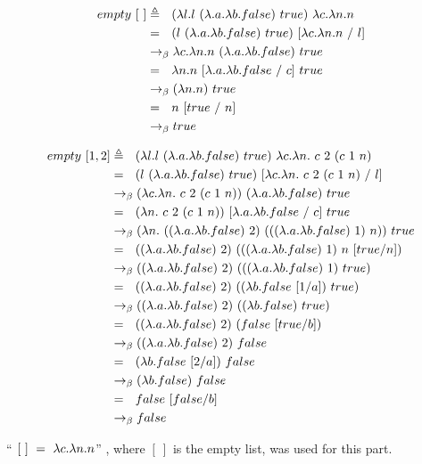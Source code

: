 \documentclass{article}
\begin{document}
\begin{Large}
		\begin{align*}
			empty \ [ \ ] &\triangleq \, \, \, \, (\lambda l.l \ (\lambda .a.\lambda b.false) \ true) \ \lambda c.\lambda n.n \\
			&= \, \, \, \, (l \ (\lambda .a.\lambda b.false) \ true) \ [\lambda c.\lambda n.n \ / \ l] \\
			&\rightarrow_\beta \lambda c.\lambda n.n \ (\lambda .a.\lambda b.false) \ true \\
			&= \, \, \, \, \lambda n.n \ [\lambda .a.\lambda b.false \ / \ c] \ true \\
			&\rightarrow_\beta (\lambda n.n) \ true \\
			&= \, \, \, \, n \ [true \ / \ n] \\
			&\rightarrow_\beta true
		\end{align*}
		
		\begin{align*}
			empty \ [1,2] &\triangleq \saq (\la l.l \ (\la .a.\la b.false) \ true) \ \la c.\la n. \ c \ 2 \ (c \ 1 \ n) \\
			&= \saq (l \ (\la .a.\la b.false) \ true) \ [\la c.\la n. \ c \ 2 \ (c \ 1 \ n) \ / \ l] \\
			&\equals (\la c.\la n. \ c \ 2 \ (c \ 1 \ n)) \ (\la .a.\la b.false) \ true \\
			&= \saq (\la n. \ c \ 2 \ (c \ 1 \ n)) \ [\la .a.\la b.false \ / \ c] \ true \\
			&\equals (\la n. \ ((\la .a.\la b.false) \ 2) \ (((\la .a.\la b.false) \ 1) \ n)) \ true \\
			&= \saq ((\la .a.\la b.false) \ 2) \ (((\la .a.\la b.false) \ 1) \ n \ [true/n]) \\
			&\equals ((\la .a.\la b.false) \ 2) \ (((\la .a.\la b.false) \ 1) \ true) \\
			&= \saq ((\la .a.\la b.false) \ 2) \ ((\la b.false \ [1/a]) \ true) \\
			&\equals ((\la .a.\la b.false) \ 2) \ ((\la b.false) \ true) \\
			&=\saq ((\la .a.\la b.false) \ 2) \ (false \ [true/b]) \\
			&\equals ((\la .a.\la b.false) \ 2) \ false \\
			&= \saq (\la b.false \ [2/a]) \ false \\
			&\equals (\la b.false) \ false \\
			&= \saq false \ [false/b] \\
			&\equals false
		\end{align*}
		\newline
		
		``$ \ [ \ ] \ = \ \lambda c.\lambda n.n$'' , where $[ \ ]$ is the empty list, was used for this part.
		
	\end{Large}
	\newpage
\end{document}
